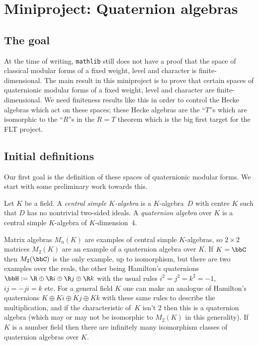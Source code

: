 \chapter{Miniproject: Quaternion algebras}\label{Quat_alg_project}

\section{The goal}

At the time of writing, {\tt mathlib} still does not have a proof that the space
of classical modular forms of a fixed weight, level and character is finite-dimensional.
The main result in this miniproject is to prove that certain spaces of quaternionic modular forms
of a fixed weight, level and character are finite-dimensional. We need finiteness results
like this in order to control the Hecke algebras which act on these spaces; these Hecke
algebras are the ``$T$''s which are isomorphic to the ``$R$''s in the $R=T$ theorem which
is the big first target for the FLT project.

\section{Initial definitions}

Our first goal is the definition of these spaces of quaternionic modular forms. We start with
some preliminary work towards this.

Let $K$ be a field. A \emph{central simple $K$-algebra} is a $K$-algebra~$D$ with
centre $K$ such that $D$ has no nontrivial two-sided ideals. A \emph{quaternion algebra}
over $K$ is a central simple $K$-algebra of $K$-dimension~4.

Matrix algebras $M_n(K)$ are examples of central simple $K$-algebras, so
$2\times 2$ matrices $M_2(K)$ are an example of a quaternion algebra over $K$.
If $K=\bbC$ then $M_2(\bbC)$ is the only example, up to isomorphism, but there are
two examples over the reals, the other being Hamilton's quaternions
$\bbH:=\R\oplus\R i\oplus\R j\oplus\R k$ with the usual rules $i^2=j^2=k^2=-1$,
$ij=-ji=k$ etc. For a general field $K$ one can make an analogue of Hamilton's
quaternions $K\oplus Ki\oplus Kj\oplus Kk$ with these same rules to describe the
multiplication, and if the characteristic of~$K$ isn't 2 then this is a quaternion algebra
(which may or may not be isomorphic to $M_2(K)$ in this generality). If $K$ is a number field
then there are infinitely many isomorphism classes of quaternion algebras over $K$.

